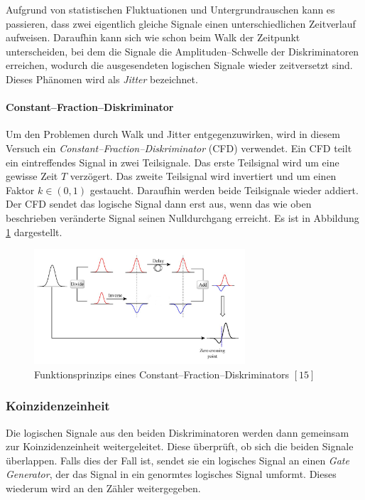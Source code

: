 \documentclass[12pt,a4paper]{scrartcl}
\numberwithin{equation}{section} %
\begin{document}
Aufgrund von statistischen Fluktuationen und Untergrundrauschen kann es passieren, dass zwei eigentlich gleiche Signale einen unterschiedlichen Zeitverlauf aufweisen. Daraufhin kann sich wie schon beim Walk der Zeitpunkt unterscheiden, bei dem die Signale die Amplituden--Schwelle der Diskriminatoren erreichen, wodurch die ausgesendeten logischen Signale wieder zeitversetzt sind. Dieses Phänomen wird als \emph{Jitter} bezeichnet.

\hypertarget{cfd}{%
\paragraph{Constant--Fraction--Diskriminator}\label{cfd}}

Um den Problemen durch Walk und Jitter entgegenzuwirken, wird in diesem Versuch ein \emph{Constant--Fraction--Diskriminator} (CFD) verwendet. Ein CFD teilt ein eintreffendes Signal in zwei Teilsignale. Das erste Teilsignal wird um eine gewisse Zeit $T$ verzögert. Das zweite Teilsignal wird invertiert und um einen Faktor $k\in(0, 1)$ gestaucht. Daraufhin werden beide Teilsignale wieder addiert. Der CFD sendet das logische Signal dann erst aus, wenn das wie oben beschrieben veränderte Signal seinen Nulldurchgang erreicht. Es ist in Abbildung \ref{abb:CFD} dargestellt.

\begin{figure}[h]
	\centering
	\includegraphics[width=0.7\textwidth]{../media/B3.4/CFD.jpg}
	\caption{Funktionsprinzips eines Constant--Fraction--Diskriminators $[15]$}
	\label{abb:CFD}
\end{figure}

\hypertarget{koinzidenzeinheit}{%
\subsubsection{Koinzidenzeinheit}\label{koinzidenzeinheit}}

Die logischen Signale aus den beiden Diskriminatoren werden dann gemeinsam zur Koinzidenzeinheit weitergeleitet. Diese überprüft, ob sich die beiden Signale überlappen. Falls dies der Fall ist, sendet sie ein logisches Signal an einen \emph{Gate Generator}, der das Signal in ein genormtes logisches Signal umformt. Dieses wiederum wird an den Zähler weitergegeben.
\end{document}
